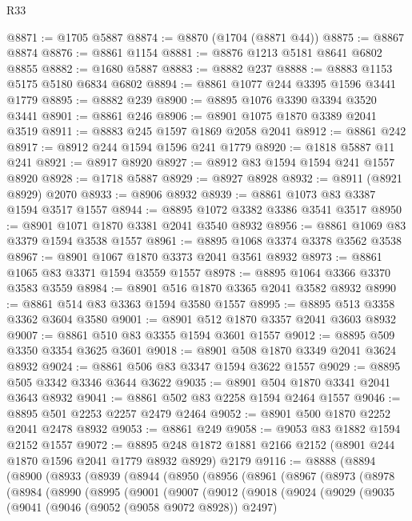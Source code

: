 \begin{lexlean}{R33}
\begin{coremodule}
@8871 := @1705 @5887
@8874 := @8870 (@1704 (@8871 @44))
@8875 := @8867 @8874
@8876 := @8861 @1154
@8881 := @8876 @1213 @5181 @8641 @6802 @8855
@8882 := @1680 @5887
@8883 := @8882 @237
@8888 := @8883 @1153 @5175 @5180 @6834 @6802
@8894 := @8861 @1077 @244 @3395 @1596 @3441 @1779
@8895 := @8882 @239
@8900 := @8895 @1076 @3390 @3394 @3520 @3441
@8901 := @8861 @246
@8906 := @8901 @1075 @1870 @3389 @2041 @3519
@8911 := @8883 @245 @1597 @1869 @2058 @2041
@8912 := @8861 @242
@8917 := @8912 @244 @1594 @1596 @241 @1779
@8920 := @1818 @5887 @11 @241
@8921 := @8917 @8920
@8927 := @8912 @83 @1594 @1594 @241 @1557 @8920
@8928 := @1718 @5887
@8929 := @8927 @8928
@8932 := @8911 (@8921 @8929) @2070
@8933 := @8906 @8932
@8939 := @8861 @1073 @83 @3387 @1594 @3517 @1557
@8944 := @8895 @1072 @3382 @3386 @3541 @3517
@8950 := @8901 @1071 @1870 @3381 @2041 @3540 @8932
@8956 := @8861 @1069 @83 @3379 @1594 @3538 @1557
@8961 := @8895 @1068 @3374 @3378 @3562 @3538
@8967 := @8901 @1067 @1870 @3373 @2041 @3561 @8932
@8973 := @8861 @1065 @83 @3371 @1594 @3559 @1557
@8978 := @8895 @1064 @3366 @3370 @3583 @3559
@8984 := @8901 @516 @1870 @3365 @2041 @3582 @8932
@8990 := @8861 @514 @83 @3363 @1594 @3580 @1557
@8995 := @8895 @513 @3358 @3362 @3604 @3580
@9001 := @8901 @512 @1870 @3357 @2041 @3603 @8932
@9007 := @8861 @510 @83 @3355 @1594 @3601 @1557
@9012 := @8895 @509 @3350 @3354 @3625 @3601
@9018 := @8901 @508 @1870 @3349 @2041 @3624 @8932
@9024 := @8861 @506 @83 @3347 @1594 @3622 @1557
@9029 := @8895 @505 @3342 @3346 @3644 @3622
@9035 := @8901 @504 @1870 @3341 @2041 @3643 @8932
@9041 := @8861 @502 @83 @2258 @1594 @2464 @1557
@9046 := @8895 @501 @2253 @2257 @2479 @2464
@9052 := @8901 @500 @1870 @2252 @2041 @2478 @8932
@9053 := @8861 @249
@9058 := @9053 @83 @1882 @1594 @2152 @1557
@9072 := @8895 @248 @1872 @1881 @2166 @2152 (@8901 @244 @1870 @1596 @2041 @1779 @8932 @8929) @2179
@9116 := @8888
    (@8894
      (@8900
        (@8933
          (@8939
            (@8944
              (@8950
                (@8956
                  (@8961
                    (@8967
                      (@8973
                        (@8978
                          (@8984
                            (@8990
                              (@8995
                                (@9001
                                  (@9007
                                    (@9012
                                      (@9018
                                        (@9024
                                          (@9029
                                            (@9035
                                              (@9041
                                                (@9046 (@9052 (@9058 @9072 @8928)) @2497)

\end{coremodule}
\end{lexlean}
